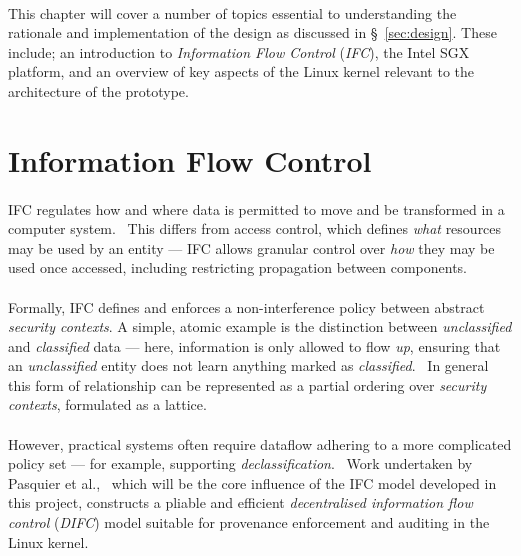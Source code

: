 
\paragraph{} This chapter will cover a number of topics essential to understanding the rationale and implementation of the design as discussed in §~\ref{sec:design}. These include; an introduction to \textit{Information Flow Control} (\textit{IFC}), the Intel SGX platform, and an overview of key aspects of the Linux kernel relevant to the architecture of the prototype.



\section{Information Flow Control}
\label{sec:ifc}

\paragraph{} IFC regulates how and where data is permitted to move and be transformed in a computer system.~\cite{ifc-data-prop} This differs from access control, which defines \textit{what} resources may be used by an entity --- IFC allows granular control over \textit{how} they may be used once accessed, including restricting propagation between components. 

\paragraph{} Formally, IFC defines and enforces a non-interference policy between abstract \textit{security contexts}. A simple, atomic example is the distinction between \textit{unclassified} and \textit{classified} data --- here, information is only allowed to flow \textit{up}, ensuring that an \textit{unclassified} entity does not learn anything marked as \textit{classified}.~\cite{Bell1973SecureCS} In general this form of relationship can be represented as a partial ordering over \textit{security contexts}, formulated as a lattice.~\cite{ifc-lattice}

\paragraph{} However, practical systems often require dataflow adhering to a more complicated policy set --- for example, supporting \textit{declassification}.~\cite{10.5555/794199.795122} Work undertaken by Pasquier et al.,~\cite{camflow} which will be the core influence of the IFC model developed in this project, constructs a pliable and efficient \textit{decentralised information flow control} (\textit{DIFC}) model suitable for provenance enforcement and auditing in the Linux kernel.

